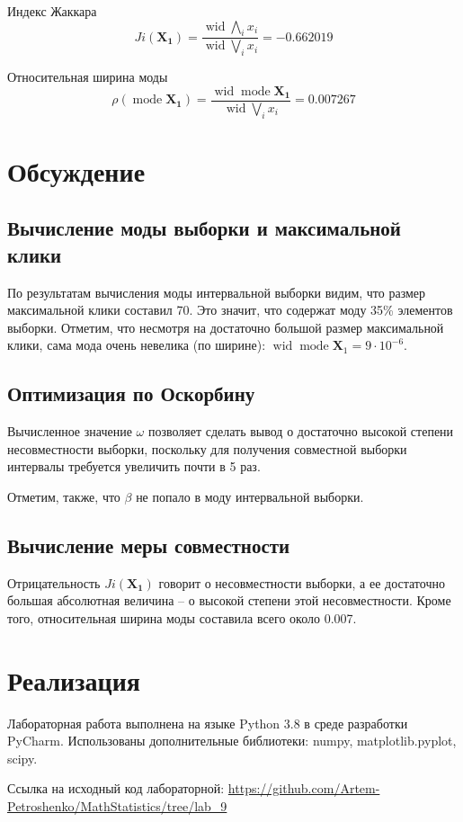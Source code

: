 \documentclass[12pt]{article}
\DeclareMathOperator{\wid}{wid}
\DeclareMathOperator{\mode}{mode}
\begin{document}
	Индекс Жаккара
	\begin{equation*}
		Ji(\mathbf{X_1}) = \dfrac{\wid \bigwedge\limits_i x_i}{\wid \bigvee\limits_i x_i} = -0.662019
	\end{equation*}
	
	Относительная ширина моды
	\begin{equation*}
		\rho(\mode\mathbf{X_1}) = \dfrac{\wid \mode\mathbf{X_1}}{\wid \bigvee\limits_i x_i} = 0.007267
	\end{equation*}
	
	\section{Обсуждение}
	
	\subsection{Вычисление моды выборки и максимальной клики}
	
	По результатам вычисления моды интервальной выборки видим, что размер максимальной клики составил 70. Это значит, что содержат моду 35\% элементов выборки. Отметим, что несмотря на достаточно большой размер максимальной клики, сама мода очень невелика (по ширине): $\wid\mode\mathbf{X}_1 = 9 \cdot 10^{-6}$.
	
	\subsection{Оптимизация по Оскорбину}
	
	Вычисленное значение $\omega$ позволяет сделать вывод о достаточно высокой степени несовместности выборки, поскольку для получения совместной выборки интервалы требуется увеличить почти в 5 раз.
	
	Отметим, также, что $\beta$ не попало в моду интервальной выборки.
	
	\subsection{Вычисление меры совместности}
	
	Отрицательность $Ji(\mathbf{X_1})$ говорит о несовместности выборки, а ее достаточно большая абсолютная величина -- о высокой степени этой несовместности. Кроме того, относительная ширина моды составила всего около 0.007.
	
	\section{Реализация}
	
	Лабораторная работа выполнена на языке Python 3.8 в среде разработки PyCharm. Использованы дополнительные библиотеки: numpy, matplotlib.pyplot, scipy.
	
	Ссылка на исходный код лабораторной: \url{https://github.com/Artem-Petroshenko/MathStatistics/tree/lab_9}
	
	
\end{document}
